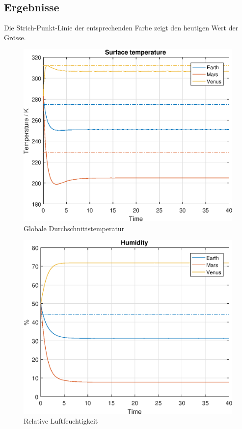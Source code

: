 \begin{refsection}
\subsection{Ergebnisse}

		Die Strich-Punkt-Linie der entsprechenden Farbe zeigt den heutigen Wert der Grösse. 

		\begin{figure}
			\center
			\includegraphics[height=0.45\textheight]{Matlab/figures/surfaceTemperature.eps}
			\caption{Globale Durchschnittstemperatur}
		\end{figure}
		
		\begin{figure}
			\center
			\includegraphics[height=0.45\textheight]{Matlab/figures/humidity.eps}
			\caption{Relative Luftfeuchtigkeit}
		\end{figure}
		

\end{refsection}
